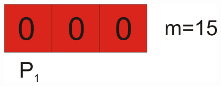 \begin{frame}
\vspace{-1.5mm}
\begin{figure}[t]
		\includegraphics{figures/SlotMach5.jpg}
\end{figure}
\end{frame}

